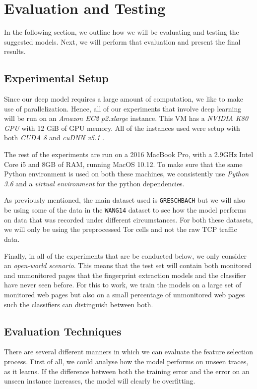 \chapter{Evaluation and Testing}

In the following section, we outline how we will be evaluating and testing the suggested models.
Next, we will perform that evaluation and present the final results.

\section{Experimental Setup}

Since our deep model requires a large amount of computation, we like to make use of parallelization.
Hence, all of our experiments that involve deep learning will be run on an \textit{Amazon EC2 p2.xlarge} instance.
This VM has a \textit{NVIDIA K80 GPU} with 12 GiB of GPU memory.
All of the instances used were setup with both \textit{CUDA 8} and \textit{cuDNN v5.1} \cite{tensorflow,nvidia_developer_2017}.

The rest of the experiments are run on a 2016 MacBook Pro, with a 2.9GHz Intel Core i5 and 8GB of RAM, running MacOS 10.12.
To make sure that the same Python environment is used on both these machines, we consistently use \textit{Python 3.6} and a \textit{virtual environment} for the python dependencies.

As previously mentioned, the main dataset used is \texttt{GRESCHBACH} but we will also be using some of the data in the \texttt{WANG14} dataset to see how the model performs on data that was recorded under different circumstances.
For both these datasets, we will only be using the preprocessed Tor cells and not the raw TCP traffic data.

Finally, in all of the experiments that are be conducted below, we only consider an \textit{open-world scenario}.
This means that the test set will contain both monitored and unmonitored pages that the fingerprint extraction models and the classifier have never seen before.
For this to work, we train the models on a large set of monitored web pages but also on a small percentage of unmonitored web pages such the classifiers can distinguish between both.

\section{Evaluation Techniques}

There are several different manners in which we can evaluate the feature selection process.
First of all, we could analyse how the model performs on unseen traces, as it learns.
If the difference between both the training error and the error on an unseen instance increases, the model will clearly be overfitting.


